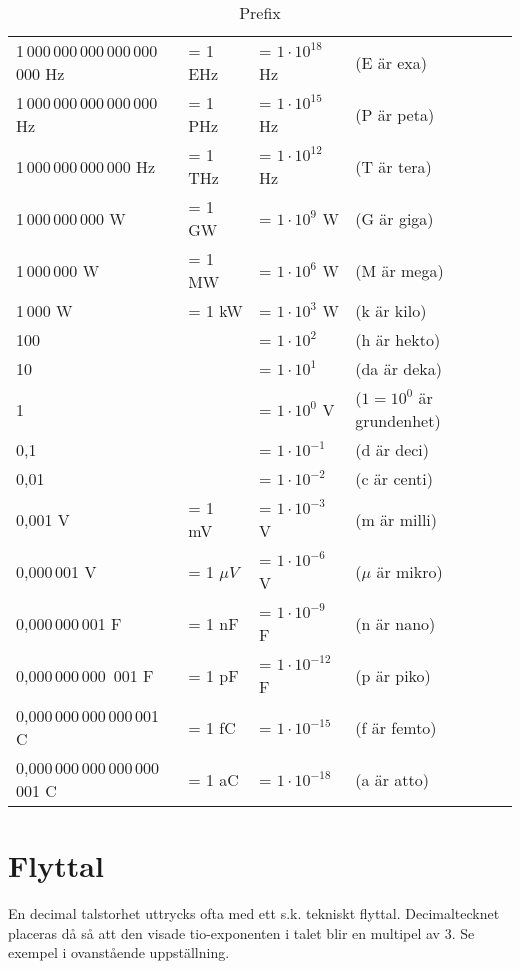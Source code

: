 \begin{table}[ht]
  \caption{Prefix}
  \label{tab:prefix}
  \begin{tabular}{|llll|}
    \hline
    1\,000\,000\,000\,000\,000\,000 Hz & = 1 EHz & = \(1 \cdot 10^{18}\) Hz & (E är exa) \\
    1\,000\,000\,000\,000\,000 Hz & = 1 PHz & = \(1 \cdot 10^{15}\) Hz & (P är peta) \\
    1\,000\,000\,000\,000 Hz & = 1 THz & = \(1 \cdot 10^{12}\) Hz & (T är tera) \\
    1\,000\,000\,000 W & = 1 GW & = \(1 \cdot 10^9\) W & (G är giga) \\
    1\,000\,000 W & = 1 MW & = \(1 \cdot 10^6\) W & (M är mega) \\
    1\,000 W & = 1 kW & = \(1 \cdot 10^3\) W & (k är kilo) \\
    100 & & = \(1 \cdot 10^2\) & (h är hekto) \\
    10 & & = \(1 \cdot 10^1\) & (da är deka) \\
    1 & & = \(1 \cdot 10^0\) V & (\(1 = 10^0\) är grundenhet) \\
    0,1 & & = \(1 \cdot 10^{-1}\) & (d är deci) \\
    0,01 & & = \(1 \cdot 10^{-2}\) & (c är centi) \\
    0,001 V & = 1 mV & = \(1 \cdot 10^{-3}\) V & (m är milli) \\
    0,000\,001 V & = 1 \(\mu V\) & = \(1 \cdot 10^{-6}\) V & (\(\mu \) är mikro) \\
    0,000\,000\,001 F & = 1 nF & = \(1 \cdot 10^{-9}\) F & (n är nano) \\
    0,000\,000\,000\, 001 F & = 1 pF & = \(1 \cdot 10^{-12}\) F & (p är piko) \\
    0,000\,000\,000\,000\,001 C & = 1 fC & = \(1 \cdot 10^{-15}\) & (f är femto) \\
    0,000\,000\,000\,000\,000\, 001 C & = 1 aC & = \(1 \cdot 10^{-18}\) & (a är atto) \\
    \hline
  \end{tabular}
\end{table}


\section{Flyttal}

En decimal talstorhet uttrycks ofta med ett s.k. tekniskt flyttal.
Decimaltecknet placeras då så att den visade tio-exponenten i talet
blir en multipel av 3.
Se exempel i ovanstående uppställning.


